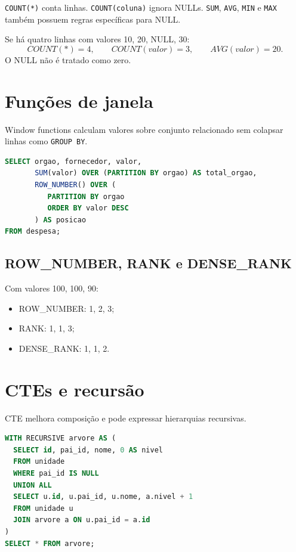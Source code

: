\texttt{COUNT(*)} conta linhas. \texttt{COUNT(coluna)} ignora NULLs. \texttt{SUM}, \texttt{AVG}, \texttt{MIN} e \texttt{MAX} também possuem regras específicas para NULL.

\begin{example}
Se há quatro linhas com valores 10, 20, NULL, 30:
\[
COUNT(*)=4,\qquad COUNT(valor)=3,\qquad AVG(valor)=20.
\]
O NULL não é tratado como zero.
\end{example}

\section{Funções de janela}

Window functions calculam valores sobre conjunto relacionado sem colapsar linhas como \texttt{GROUP BY}.

\begin{lstlisting}[language=SQL]
SELECT orgao, fornecedor, valor,
       SUM(valor) OVER (PARTITION BY orgao) AS total_orgao,
       ROW_NUMBER() OVER (
          PARTITION BY orgao
          ORDER BY valor DESC
       ) AS posicao
FROM despesa;
\end{lstlisting}

\subsection{ROW\_NUMBER, RANK e DENSE\_RANK}

Com valores 100, 100, 90:
\begin{itemize}
\item ROW\_NUMBER: 1, 2, 3;
\item RANK: 1, 1, 3;
\item DENSE\_RANK: 1, 1, 2.
\end{itemize}

\section{CTEs e recursão}

CTE melhora composição e pode expressar hierarquias recursivas.

\begin{lstlisting}[language=SQL]
WITH RECURSIVE arvore AS (
  SELECT id, pai_id, nome, 0 AS nivel
  FROM unidade
  WHERE pai_id IS NULL
  UNION ALL
  SELECT u.id, u.pai_id, u.nome, a.nivel + 1
  FROM unidade u
  JOIN arvore a ON u.pai_id = a.id
)
SELECT * FROM arvore;
\end{lstlisting}

